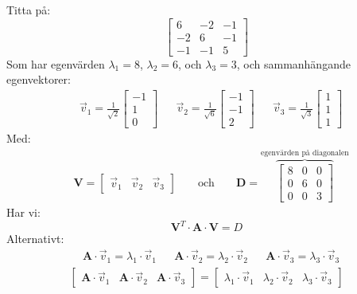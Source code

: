 \begin{Ex}
	Titta på:
	\[
	\begin{bmatrix}
		6 & -2 & -1\\
		-2 & 6 & -1\\
		-1 & -1 & 5
	\end{bmatrix}
	\]
	Som har egenvärden $\lambda_1 = 8$, $\lambda_2 = 6$, och $\lambda_3 = 3$, och sammanhängande egenvektorer:
	\begin{align*}
	& \vec{v}_1 = \frac{1}{\sqrt{2}}\begin{bmatrix} -1\\1\\0 \end{bmatrix}
	&&\vec{v}_2 = \frac{1}{\sqrt{6}}\begin{bmatrix} -1\\-1\\2 \end{bmatrix}
	&&\vec{v}_3 = \frac{1}{\sqrt{3}}\begin{bmatrix} 1\\1\\1 \end{bmatrix}
	\end{align*}
	Med:
	\begin{align*}
	& \mathbf{V} = \begin{bmatrix} \vec{v}_1&\vec{v}_2&\vec{v}_3 \end{bmatrix}
	&&\mbox{ och }
	&& \mathbf{D} = 
	\overbrace{\begin{bmatrix}
		8 & 0 & 0\\
		0 & 6 & 0\\
		0 & 0 & 3
	\end{bmatrix}}^\text{egenvärden på diagonalen}
	\end{align*}
	Har vi:
	\[
	\mathbf{V}^T \cdot \mathbf{A} \cdot \mathbf{V} = D
	\]
	Alternativt:
	\begin{align*}
	& \mathbf{A} \cdot \vec{v}_1 = \lambda_1 \cdot \vec{v}_1
	&& \mathbf{A} \cdot \vec{v}_2 = \lambda_2 \cdot \vec{v}_2
	&& \mathbf{A} \cdot \vec{v}_3 = \lambda_3 \cdot \vec{v}_3
	\end{align*}
	\begin{gather*}
			\begin{bmatrix}
		\mathbf{A} \cdot \vec{v}_1 & 
		\mathbf{A} \cdot \vec{v}_2 & 
		\mathbf{A} \cdot \vec{v}_3
	\end{bmatrix}
	= 
	\begin{bmatrix}
		\lambda_1 \cdot \vec{v}_1&
		\lambda_2 \cdot \vec{v}_2&
		\lambda_3 \cdot \vec{v}_3
	\end{bmatrix}\\

\end{gather*}
\end{Ex}
